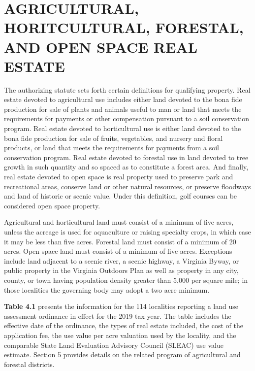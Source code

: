 \documentclass[
]{book}
\begin{document}
\hypertarget{agricultural-horitcultural-forestal-and-open-space-real-estate}{%
\section{AGRICULTURAL, HORITCULTURAL, FORESTAL, AND OPEN SPACE REAL ESTATE}\label{agricultural-horitcultural-forestal-and-open-space-real-estate}}

The authorizing statute sets forth certain definitions for qualifying property. Real estate devoted to agricultural use includes either land devoted to the bona fide production for sale of plants and animals useful to man or land that meets the requirements for payments or other compensation pursuant to a soil conservation program. Real estate devoted to horticultural use is either land devoted to the bona fide production for sale of fruits, vegetables, and nursery and floral products, or land that meets the requirements for payments from a soil conservation program. Real estate devoted to forestal use in land devoted to tree growth in such quantity and so spaced as to constitute a forest area. And finally, real estate devoted to open space is real property used to preserve park and recreational areas, conserve land or other natural resources, or preserve floodways and land of historic or scenic value. Under this definition, golf courses can be considered open space property.

Agricultural and horticultural land must consist of a minimum of five acres, unless the acreage is used for aquaculture or raising specialty crops, in which case it may be less than five acres. Forestal land must consist of a minimum of 20 acres. Open space land must consist of a minimum of five acres. Exceptions include land adjacent to a scenic river, a scenic highway, a Virginia Byway, or public property in the Virginia Outdoors Plan as well as property in any city, county, or town having population density greater than 5,000 per square mile; in those localities the governing body may adopt a two acre minimum.

\textbf{Table 4.1} presents the information for the 114 localities reporting a land use assessment ordinance in effect for the 2019 tax year. The table includes the effective date of the ordinance, the types of real estate included, the cost of the application fee, the use value per acre valuation used by the locality, and the comparable State Land Evaluation Advisory Council (SLEAC) use value estimate. Section 5 provides details on the related program of agricultural and forestal districts.
\end{document}
